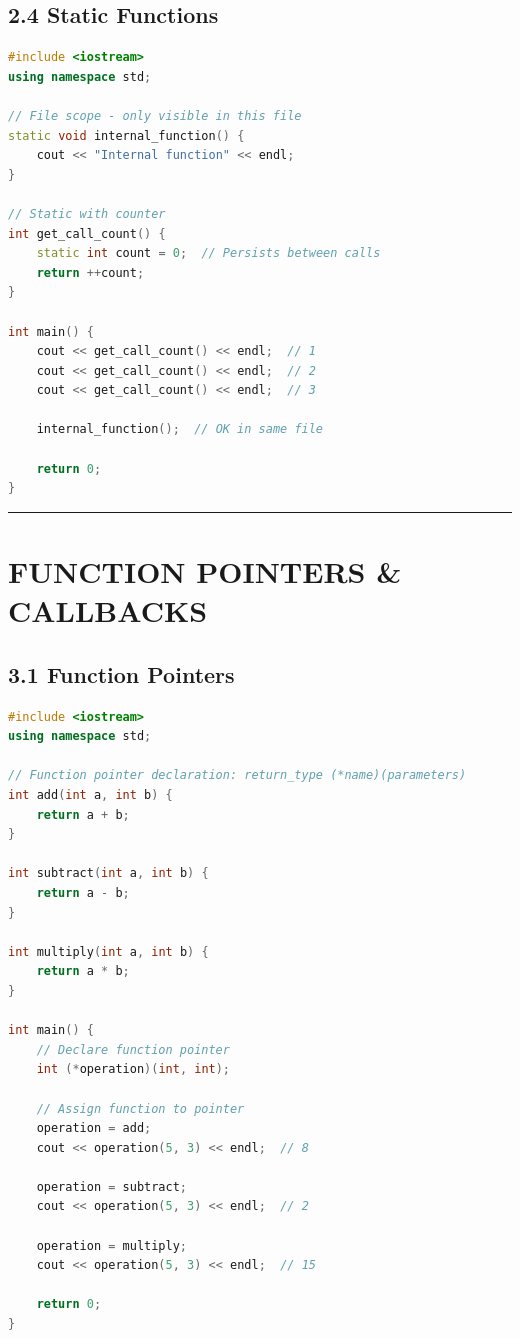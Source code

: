 \hypertarget{static-functions}{%
\subsection{2.4 Static Functions}\label{static-functions}}

\begin{lstlisting}[language={C++}]
#include <iostream>
using namespace std;

// File scope - only visible in this file
static void internal_function() {
    cout << "Internal function" << endl;
}

// Static with counter
int get_call_count() {
    static int count = 0;  // Persists between calls
    return ++count;
}

int main() {
    cout << get_call_count() << endl;  // 1
    cout << get_call_count() << endl;  // 2
    cout << get_call_count() << endl;  // 3

    internal_function();  // OK in same file

    return 0;
}
\end{lstlisting}

\begin{center}\rule{0.5\linewidth}{0.5pt}\end{center}

\hypertarget{function-pointers-callbacks}{%
\section{FUNCTION POINTERS \&
CALLBACKS}\label{function-pointers-callbacks}}

\hypertarget{function-pointers}{%
\subsection{3.1 Function Pointers}\label{function-pointers}}

\begin{lstlisting}[language={C++}]
#include <iostream>
using namespace std;

// Function pointer declaration: return_type (*name)(parameters)
int add(int a, int b) {
    return a + b;
}

int subtract(int a, int b) {
    return a - b;
}

int multiply(int a, int b) {
    return a * b;
}

int main() {
    // Declare function pointer
    int (*operation)(int, int);

    // Assign function to pointer
    operation = add;
    cout << operation(5, 3) << endl;  // 8

    operation = subtract;
    cout << operation(5, 3) << endl;  // 2

    operation = multiply;
    cout << operation(5, 3) << endl;  // 15

    return 0;
}
\end{lstlisting}

